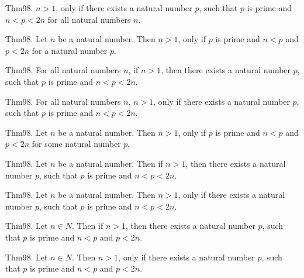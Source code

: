 \documentclass{article}
\begin{document}
Thm98. $n > 1$, only if there exists a natural number $p$, such that $p$ is prime and $n < p < 2 n$ for all natural numbers $n$.

Thm98. Let $n$ be a natural number. Then $n > 1$, only if $p$ is prime and $n < p$ and $p < 2 n$ for a natural number $p$.

Thm98. For all natural numbers $n$, if $n > 1$, then there exists a natural number $p$, such that $p$ is prime and $n < p < 2 n$.

Thm98. For all natural numbers $n$, $n > 1$, only if there exists a natural number $p$, such that $p$ is prime and $n < p < 2 n$.

Thm98. Let $n$ be a natural number. Then $n > 1$, only if $p$ is prime and $n < p$ and $p < 2 n$ for some natural number $p$.

Thm98. Let $n$ be a natural number. Then if $n > 1$, then there exists a natural number $p$, such that $p$ is prime and $n < p < 2 n$.

Thm98. Let $n$ be a natural number. Then $n > 1$, only if there exists a natural number $p$, such that $p$ is prime and $n < p < 2 n$.

Thm98. Let $n \in N$. Then if $n > 1$, then there exists a natural number $p$, such that $p$ is prime and $n < p$ and $p < 2 n$.

Thm98. Let $n \in N$. Then $n > 1$, only if there exists a natural number $p$, such that $p$ is prime and $n < p$ and $p < 2 n$.
\end{document}
